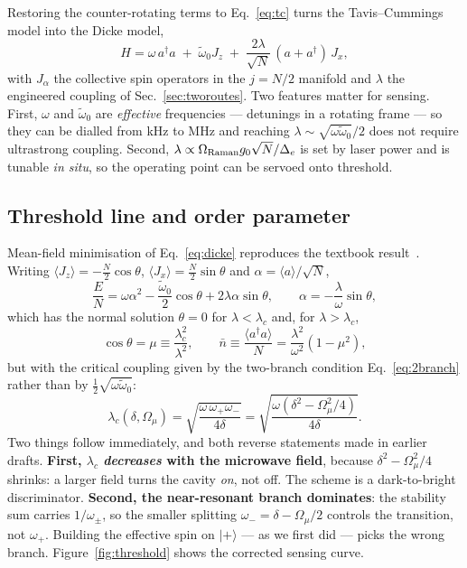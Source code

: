 \documentclass[11pt,a4paper]{article}
\newcommand{\dg}{^{\dagger}}
\newcommand{\Om}{\Omega}
\newcommand{\Omu}{\Omega_{\mu}}
\newcommand{\wt}{\tilde{\omega}_{0}}
\newcommand{\lc}{\lambda_{c}}
\newcommand{\ket}[1]{\lvert #1 \rangle}
\newcommand{\avg}[1]{\langle #1 \rangle}
\begin{document}
Restoring the counter-rotating terms to Eq.~\eqref{eq:tc} turns the Tavis--Cummings model into
the Dicke model,
\begin{equation}
  H = \omega\, a\dg a \;+\; \wt J_z \;+\; \frac{2\lambda}{\sqrt N}\,(a+a\dg)\,J_x ,
  \label{eq:dicke}
\end{equation}
with $J_\alpha$ the collective spin operators in the $j=N/2$ manifold and $\lambda$ the
engineered coupling of Sec.~\ref{sec:tworoutes}. Two features matter for sensing. First,
$\omega$ and $\wt$ are \emph{effective} frequencies --- detunings in a rotating frame --- so
they can be dialled from kHz to MHz and reaching $\lambda\sim\sqrt{\omega\wt}/2$ does not
require ultrastrong coupling. Second, $\lambda\propto\Om_{\rm Raman}g_0\sqrt N/\Delta_e$ is set
by laser power and is tunable \emph{in situ}, so the operating point can be servoed onto
threshold.

\subsection{Threshold line and order parameter}

Mean-field minimisation of Eq.~\eqref{eq:dicke} reproduces the textbook
result~\cite{Emary2003}. Writing $\avg{J_z} = -\tfrac{N}{2}\cos\theta$,
$\avg{J_x}=\tfrac{N}{2}\sin\theta$ and $\alpha=\avg{a}/\sqrt N$,
\begin{equation}
  \frac{E}{N} = \omega\alpha^2 - \frac{\wt}{2}\cos\theta + 2\lambda\alpha\sin\theta ,
  \qquad \alpha = -\frac{\lambda}{\omega}\sin\theta ,
\end{equation}
which has the normal solution $\theta=0$ for $\lambda<\lc$ and, for $\lambda>\lc$,
\begin{equation}
  \cos\theta = \mu \equiv \frac{\lc^2}{\lambda^2},
  \qquad
  \bar n \equiv \frac{\avg{a\dg a}}{N} = \frac{\lambda^2}{\omega^2}\left(1-\mu^2\right),
\end{equation}
but with the critical coupling given by the two-branch condition
Eq.~\eqref{eq:2branch} rather than by $\tfrac12\sqrt{\omega\wt}$:
\begin{equation}
  \lc(\delta,\Omu) = \sqrt{\frac{\omega\,\omega_+\omega_-}{4\delta}}
  = \sqrt{\frac{\omega\left(\delta^2-\Omu^2/4\right)}{4\delta}} .
  \label{eq:lamc2}
\end{equation}
Two things follow immediately, and both reverse statements made in earlier drafts.
\textbf{First, $\lc$ \emph{decreases} with the microwave field}, because $\delta^2-\Omu^2/4$
shrinks: a larger field turns the cavity \emph{on}, not off. The scheme is a dark-to-bright
discriminator. \textbf{Second, the near-resonant branch dominates}: the stability sum carries
$1/\omega_\pm$, so the smaller splitting $\omega_-=\delta-\Omu/2$ controls the transition,
not $\omega_+$. Building the effective spin on $\ket{+}$ --- as we first did --- picks the
wrong branch.
Figure~\ref{fig:threshold} shows the corrected sensing curve.
\end{document}
